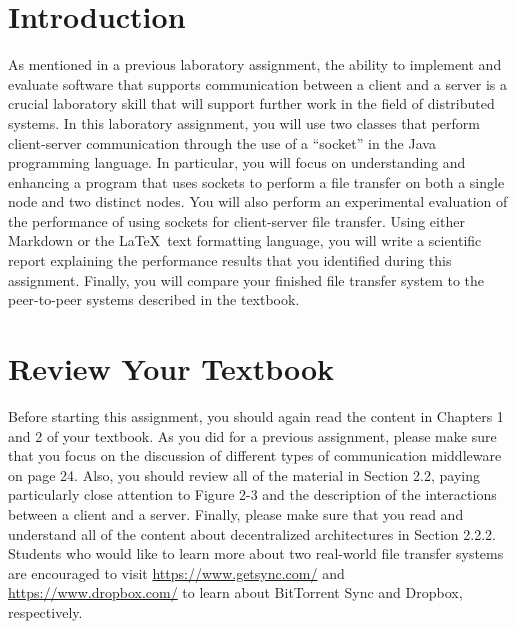 


\usepackage[compact]{titlesec}



\section*{Introduction}

As mentioned in a previous laboratory assignment, the ability to implement and evaluate software that supports
communication between a client and a server is a crucial laboratory skill that will support further work in the field of
distributed systems. In this laboratory assignment, you will use two classes that perform client-server communication
through the use of a ``socket'' in the Java programming language. In particular, you will focus on understanding and
enhancing a program that uses sockets to perform a file transfer on both a single node and two distinct nodes.  You will
also perform an experimental evaluation of the performance of using sockets for client-server file transfer.  Using
either Markdown or the \LaTeX~text formatting language, you will write a scientific report explaining the performance
results that you identified during this assignment. Finally, you will compare your finished file transfer system to the
peer-to-peer systems described in the textbook.

\section*{Review Your Textbook}

Before starting this assignment, you should again read the content in Chapters 1 and 2 of your textbook. As
you did for a previous assignment, please make sure that you focus on the discussion of different types of communication
middleware on page 24. Also, you should review all of the material in Section 2.2, paying particularly close attention
to Figure 2-3 and the description of the interactions between a client and a server. Finally, please make sure that you
read and understand all of the content about decentralized architectures in Section 2.2.2. Students who would like to
learn more about two real-world file transfer systems are encouraged to visit \url{https://www.getsync.com/} and
\url{https://www.dropbox.com/} to learn about BitTorrent Sync and Dropbox, respectively.

